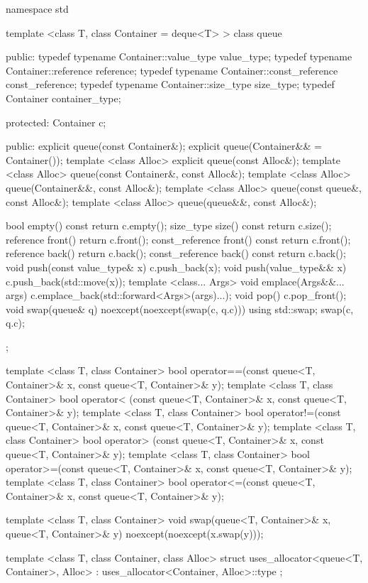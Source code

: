 \begin{codeblock}
namespace std {
  template <class T, class Container = deque<T> >
  class queue {
  public:
    typedef typename Container::value_type            value_type;
    typedef typename Container::reference             reference;
    typedef typename Container::const_reference       const_reference;
    typedef typename Container::size_type             size_type;
    typedef          Container                        container_type;

  protected:
    Container c;

  public:
    explicit queue(const Container&);
    explicit queue(Container&& = Container());
    template <class Alloc> explicit queue(const Alloc&);
    template <class Alloc> queue(const Container&, const Alloc&);
    template <class Alloc> queue(Container&&, const Alloc&);
    template <class Alloc> queue(const queue&, const Alloc&);
    template <class Alloc> queue(queue&&, const Alloc&);

    bool              empty() const     { return c.empty(); }
    size_type         size()  const     { return c.size(); }
    reference         front()           { return c.front(); }
    const_reference   front() const     { return c.front(); }
    reference         back()            { return c.back(); }
    const_reference   back() const      { return c.back(); }
    void push(const value_type& x)      { c.push_back(x); }
    void push(value_type&& x)           { c.push_back(std::move(x)); }
    template <class... Args>
      void emplace(Args&&... args)      { c.emplace_back(std::forward<Args>(args)...); }
    void pop()                          { c.pop_front(); }
    void swap(queue& q) noexcept(noexcept(swap(c, q.c)))
      { using std::swap; swap(c, q.c); }
  };

  template <class T, class Container>
    bool operator==(const queue<T, Container>& x, const queue<T, Container>& y);
  template <class T, class Container>
    bool operator< (const queue<T, Container>& x, const queue<T, Container>& y);
  template <class T, class Container>
    bool operator!=(const queue<T, Container>& x, const queue<T, Container>& y);
  template <class T, class Container>
    bool operator> (const queue<T, Container>& x, const queue<T, Container>& y);
  template <class T, class Container>
    bool operator>=(const queue<T, Container>& x, const queue<T, Container>& y);
  template <class T, class Container>
    bool operator<=(const queue<T, Container>& x, const queue<T, Container>& y);

  template <class T, class Container>
    void swap(queue<T, Container>& x, queue<T, Container>& y) noexcept(noexcept(x.swap(y)));

  template <class T, class Container, class Alloc>
    struct uses_allocator<queue<T, Container>, Alloc>
      : uses_allocator<Container, Alloc>::type { };
}
\end{codeblock}

